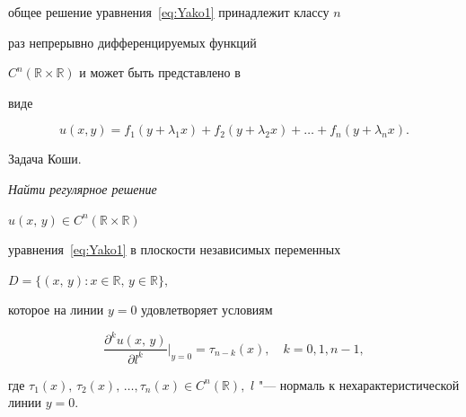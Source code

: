 общее решение уравнения~\eqref{eq:Yako1} принадлежит классу $n$

раз непрерывно дифференцируемых функций

$C^{n}(\mathbb{R}\times\mathbb{R})$ и может быть представлено в

виде

$$

u(x,y)=f_{1}(y+\lambda_{1}x)+f_{2}(y+\lambda_{2}x)+\ldots

+f_{n}(y+\lambda_{n}x).

$$



\smallskip



{\small\sc Задача Коши.} {\it Найти регулярное решение

$u\left(x,\,y\right)\in C^{n}(\mathbb{R}\times\mathbb{R})$

уравнения~\eqref{eq:Yako1} в плоскости независимых переменных

$D=\{\left(x,\,y\right): x \in \mathbb{R},\, y \in \mathbb{R}\},$

которое на линии $y=0$ удовлетворяет условиям

 \begin{equation}

\dfrac{\partial^{k} u(x,\,y)}{\partial l^{k}}\Bigr|_{y=0}=\tau_{n-k}(x),\quad k=0, 1, n-1,\label{eq:Yako2}

\end{equation}








где $\tau_{1}(x),\,\tau_{2}(x),\,\ldots,\tau_{n}(x) \in

C^{n}(\mathbb{R}),$ ${l}$ "--- нормаль к нехарактеристической линии $y=0.$

}

